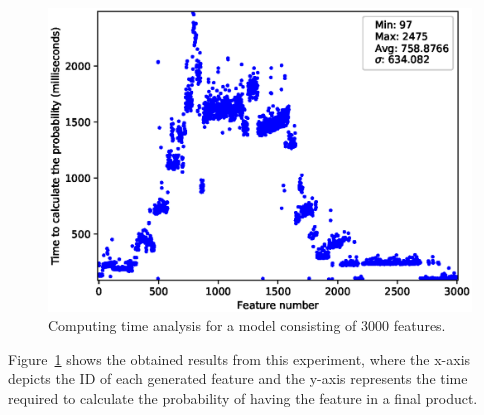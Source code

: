 \begin{figure}[h]
        \centering
        \linefigure
        \includegraphics[width=0.8\hsize,angle=0]{plot_probs_times_FeatureModel3000.eps}
        \linefigure
        \caption{Computing time analysis for a model consisting of 3000 features.}\label{fig:plot:probs:times}
\end{figure}

Figure~\ref{fig:plot:probs:times} shows the obtained
results from this experiment, where the x-axis depicts
the ID of each generated feature and the y-axis represents
the time required to calculate the probability of having the feature in a final product.



